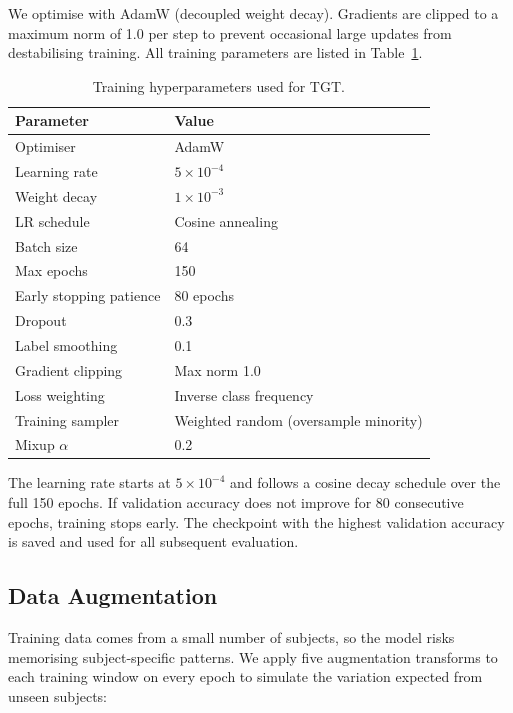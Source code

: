 \documentclass[11pt,a4paper,twocolumn]{article}
\begin{document}
We optimise with AdamW (decoupled weight decay). Gradients are clipped to a maximum norm of 1.0 per step to prevent occasional large updates from destabilising training. All training parameters are listed in Table~\ref{tab:training-params}.

\begin{table}[ht]
\centering
\small
\begin{tabular}{ll}
\toprule
\textbf{Parameter} & \textbf{Value} \\
\midrule
Optimiser & AdamW \\
Learning rate & $5 \times 10^{-4}$ \\
Weight decay & $1 \times 10^{-3}$ \\
LR schedule & Cosine annealing \\
Batch size & 64 \\
Max epochs & 150 \\
Early stopping patience & 80 epochs \\
Dropout & 0.3 \\
Label smoothing & 0.1 \\
Gradient clipping & Max norm 1.0 \\
Loss weighting & Inverse class frequency \\
Training sampler & Weighted random (oversample minority) \\
Mixup $\alpha$ & 0.2 \\
\bottomrule
\end{tabular}
\caption{Training hyperparameters used for TGT.}
\label{tab:training-params}
\end{table}

The learning rate starts at $5 \times 10^{-4}$ and follows a cosine decay schedule over the full 150 epochs. If validation accuracy does not improve for 80 consecutive epochs, training stops early. The checkpoint with the highest validation accuracy is saved and used for all subsequent evaluation.

\subsection{Data Augmentation}

Training data comes from a small number of subjects, so the model risks memorising subject-specific patterns. We apply five augmentation transforms to each training window on every epoch to simulate the variation expected from unseen subjects:
\end{document}
